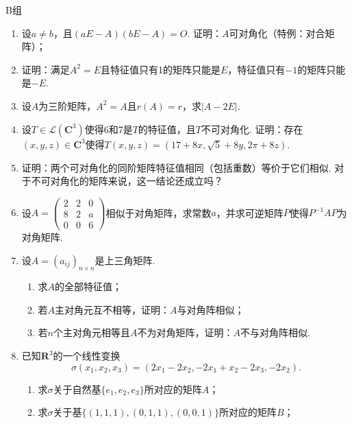 \centerline{\heiti B组}
\begin{enumerate}
    \item 设$a\neq b$，且$(aE-A)(bE-A)=O$. 证明：$A$可对角化（特例：对合矩阵）；

    \item 证明：满足$A^2=E$且特征值只有1的矩阵只能是$E$，特征值只有$-1$的矩阵只能是$-E$.

    \item 设$A$为三阶矩阵，$A^2=A$且$r(A)=r$，求$|A-2E|$.

    \item 设$T\in \mathcal{L}(\mathbf{C}^3)$使得6和7是$T$的特征值，且$T$不可对角化. 证明：存在$(x,y,z)\in\mathbf{C}^3$使得$T(x,y,z)=(17+8x,\sqrt{5}+8y,2\pi+8z)$.

    \item 证明：两个可对角化的同阶矩阵特征值相同（包括重数）等价于它们相似. 对于不可对角化的矩阵来说，这一结论还成立吗？

    \item 设$A=\begin{pmatrix}
                  2 & 2 & 0 \\ 8 & 2 & a \\ 0 & 0 & 6
              \end{pmatrix}$相似于对角矩阵，求常数$a$，并求可逆矩阵$P$使得$P^{-1}AP$为对角矩阵.

    \item 设$A=(a_{ij})_{n\times n}$是上三角矩阵.
          \begin{enumerate}
              \item 求$A$的全部特征值；

              \item 若$A$主对角元互不相等，证明：$A$与对角阵相似；

              \item 若$n$个主对角元相等且$A$不为对角矩阵，证明：$A$不与对角阵相似.
          \end{enumerate}

    \item 已知$\mathbf{R}^3$的一个线性变换
          \[\sigma(x_1,x_2,x_3)=(2x_1-2x_2,-2x_1+x_2-2x_3,-2x_2).\]
          \begin{enumerate}
              \item 求$\sigma$关于自然基$\{e_1,e_2,e_3\}$所对应的矩阵$A$；

              \item 求$\sigma$关于基$\{(1,1,1),(0,1,1),(0,0,1)\}$所对应的矩阵$B$；


\end{enumerate}
\end{enumerate}

